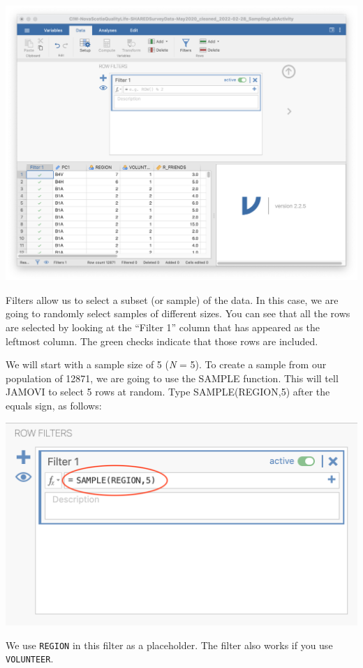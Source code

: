 \documentclass[
]{book}
\begin{document}
\includegraphics{img/FiltersPanel.png}

Filters allow us to select a subset (or sample) of the data. In this case, we are going to randomly select samples of different sizes. You can see that all the rows are selected by looking at the ``Filter 1'' column that has appeared as the leftmost column. The green checks indicate that those rows are included.

We will start with a sample size of 5 (\emph{N} = 5). To create a sample from our population of 12871, we are going to use the SAMPLE function. This will tell JAMOVI to select 5 rows at random. Type SAMPLE(REGION,5) after the equals sign, as follows:

\includegraphics{img/SAMPLEN5.png}

We use \texttt{REGION} in this filter as a placeholder. The filter also works if you use \texttt{VOLUNTEER}.
\end{document}
